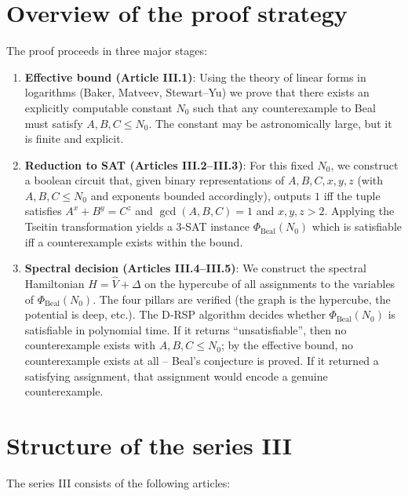 \documentclass[11pt,a4paper]{article}
\begin{document}
\section{Overview of the proof strategy}

The proof proceeds in three major stages:

\begin{enumerate}
\item \textbf{Effective bound (Article III.1)}: Using the theory of linear forms in logarithms (Baker, Matveev, Stewart–Yu) we prove that there exists an explicitly computable constant \(N_0\) such that any counterexample to Beal must satisfy \(A,B,C \le N_0\). The constant may be astronomically large, but it is finite and explicit.
\item \textbf{Reduction to SAT (Articles III.2–III.3)}: For this fixed \(N_0\), we construct a boolean circuit that, given binary representations of \(A,B,C,x,y,z\) (with \(A,B,C \le N_0\) and exponents bounded accordingly), outputs \(1\) iff the tuple satisfies \(A^x + B^y = C^z\) and \(\gcd(A,B,C)=1\) and \(x,y,z>2\). Applying the Tseitin transformation yields a 3‑SAT instance \(\Phi_{\text{Beal}}(N_0)\) which is satisfiable iff a counterexample exists within the bound.
\item \textbf{Spectral decision (Articles III.4–III.5)}: We construct the spectral Hamiltonian \(H = \hat{V} + \Delta\) on the hypercube of all assignments to the variables of \(\Phi_{\text{Beal}}(N_0)\). The four pillars are verified (the graph is the hypercube, the potential is deep, etc.). The D‑RSP algorithm decides whether \(\Phi_{\text{Beal}}(N_0)\) is satisfiable in polynomial time. If it returns “unsatisfiable”, then no counterexample exists with \(A,B,C \le N_0\); by the effective bound, no counterexample exists at all – Beal's conjecture is proved. If it returned a satisfying assignment, that assignment would encode a genuine counterexample.
\end{enumerate}

\section{Structure of the series III}

The series III consists of the following articles:
\end{document}
